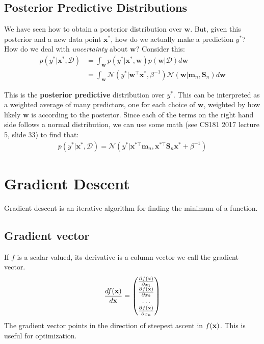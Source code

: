 \documentclass[12pt,letterpaper]{article}
\begin{document}
\subsection{Posterior Predictive Distributions}

We have seen how to obtain a posterior distribution over $\mathbf{w}$. But, given this posterior and a new data point $\mathbf{x}^{*}$,
how do we actually make a prediction $y^{*}$? How do we deal with \textit{uncertainty} about $\mathbf{w}$? Consider this:
\begin{align}
p(y^{*}| \mathbf{x}^{*}, \mathcal{D}) &= \int_{\mathbf{w}} p(y^{*}|\mathbf{x}^{*}, \mathbf{w})p(\mathbf{w} | \mathcal{D}) d\mathbf{w}\\
&= \int_{\mathbf{w}} \mathcal{N}(y^{*}|\mathbf{w}^\top\mathbf{x}^{*}, \beta^{-1}) \mathcal{N}(\mathbf{w}|\mathbf{m}_n, \mathbf{S}_n) d\mathbf{w} 
\end{align}

\noindent This is the \textbf{posterior predictive} distribution over $y^{*}$. This can be interpreted as a weighted average of many predictors, 
one for each choice of $\mathbf{w}$, weighted by how likely $\mathbf{w}$ is according to the posterior. Since each of the terms on the right hand side 
follows a normal distribution, we can use some math (see CS181 2017 lecture 5, slide 33) to find that:
\begin{align}
p(y^{*}| \mathbf{x}^{*}, \mathcal{D}) = \mathcal{N}(y^{*}| \mathbf{x}^{*\top}\mathbf{m}_n, \mathbf{x}^{*\top}\mathbf{S}_n\mathbf{x}^{*} + \beta^{-1})
\end{align}

\section{Gradient Descent}
Gradient descent is an iterative algorithm for finding the minimum of a function. 

\subsection{Gradient vector}
If $f$ is a scalar-valued, its derivative is a column vector we call the gradient vector.
\begin{align}\frac{d f(\mathbf{x})}{d\mathbf{x}} =\begin{pmatrix}\frac{\partial f(\mathbf{x})}{\partial x_1} \\ \frac{\partial f(\mathbf{x})}{\partial x_2}\\ \dots \\ \frac{\partial f(\mathbf{x})}{\partial x_n}\end{pmatrix}\end{align}
The gradient vector points in the direction of steepest ascent in $f(\mathbf{x})$. This is useful for optimization.
\end{document}
